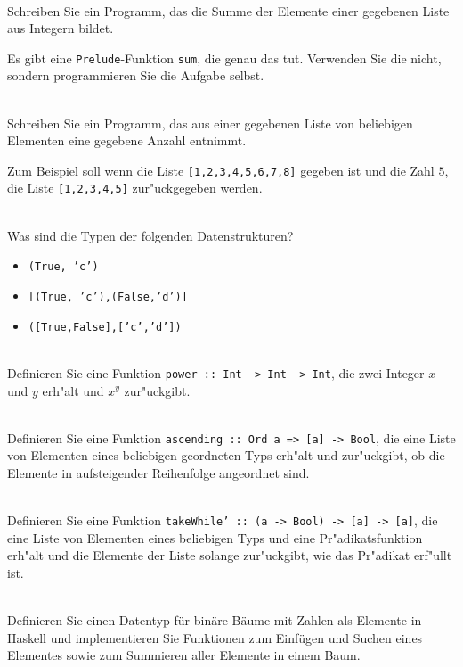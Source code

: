 \\
Schreiben Sie ein Programm, das die Summe der Elemente einer gegebenen Liste aus Integern bildet.
\begin{notes}
  Es gibt eine \texttt{Prelude}-Funktion \texttt{sum}, die genau das tut. Verwenden Sie die nicht, sondern programmieren Sie die Aufgabe selbst.
\end{notes}


\\
Schreiben Sie ein Programm, das aus einer gegebenen Liste von beliebigen Elementen eine gegebene Anzahl entnimmt.

Zum Beispiel soll wenn die Liste \texttt{[1,2,3,4,5,6,7,8]} gegeben ist und die Zahl $5$, die Liste \texttt{[1,2,3,4,5]} zur"uckgegeben werden.

\\
Was sind die Typen der folgenden Datenstrukturen?
\begin{itemize}[(i)]
  \item \texttt{(True, 'c')}
  \item \texttt{[(True, 'c'),(False,'d')]}
  \item \texttt{([True,False],['c','d'])}
\end{itemize}

\\
Definieren Sie eine Funktion \texttt{power :: Int -> Int -> Int}, die zwei Integer $x$ und $y$ erh"alt und $x^y$ zur"uckgibt.

\\
Definieren Sie eine Funktion \texttt{ascending :: Ord a => [a] -> Bool}, die eine Liste von Elementen eines beliebigen geordneten Typs erh"alt und zur"uckgibt, ob die Elemente in aufsteigender Reihenfolge angeordnet sind.

\\
Definieren Sie eine Funktion \texttt{takeWhile' :: (a -> Bool) -> [a] -> [a]}, die eine Liste von Elementen eines beliebigen Typs und eine Pr"adikatsfunktion erh"alt und die Elemente der Liste solange zur"uckgibt, wie das Pr"adikat erf"ullt ist.

\\
Definieren Sie einen Datentyp für binäre Bäume mit Zahlen als Elemente in Haskell und implementieren Sie Funktionen zum Einfügen und Suchen eines Elementes sowie zum Summieren aller Elemente in einem Baum.

